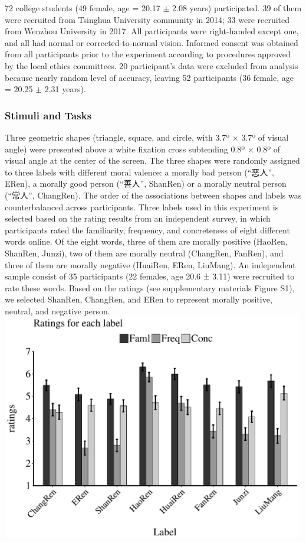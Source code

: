 \documentclass[
  english,
  man]{apa6}
\begin{document}
72 college students (49 female, age = 20.17 \(\pm\) 2.08 years) participated. 39 of them were recruited from Tsinghua University community in 2014; 33 were recruited from Wenzhou University in 2017. All participants were right-handed except one, and all had normal or corrected-to-normal vision. Informed consent was obtained from all participants prior to the experiment according to procedures approved by the local ethics committees. 20 participant's data were excluded from analysis because nearly random level of accuracy, leaving 52 participants (36 female, age = 20.25 \(\pm\) 2.31 years).

\hypertarget{stimuli-and-tasks-1}{%
\subsubsection{Stimuli and Tasks}\label{stimuli-and-tasks-1}}

Three geometric shapes (triangle, square, and circle, with 3.7º × 3.7º of visual angle) were presented above a white fixation cross subtending 0.8º × 0.8º of visual angle at the center of the screen. The three shapes were randomly assigned to three labels with different moral valence: a morally bad person (\enquote{恶人}, ERen), a morally good person (\enquote{善人}, ShanRen) or a morally neutral person (\enquote{常人}, ChangRen). The order of the associations between shapes and labels was counterbalanced across participants.
Three labels used in this experiment is selected based on the rating results from an independent survey, in which participants rated the familiarity, frequency, and concreteness of eight different words online. Of the eight words, three of them are morally positive (HaoRen, ShanRen, Junzi), two of them are morally neutral (ChangRen, FanRen), and three of them are morally negative (HuaiRen, ERen, LiuMang). An independent sample consist of 35 participants (22 females, age 20.6 ± 3.11) were recruited to rate these words. Based on the ratings (see supplementary materials Figure S1), we selected ShanRen, ChangRen, and ERen to represent morally positive, neutral, and negative person.
\includegraphics[width=5.20833in,height=\textheight]{exp1b/Familiarity_ratings/df1b_fami_rating.pdf}
\end{document}
